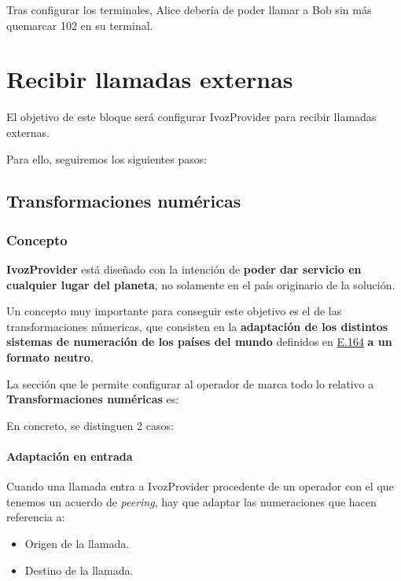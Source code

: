 \documentclass[letterpaper,10pt,spanish]{sphinxmanual}
\begin{document}
Tras configurar los terminales, Alice debería de poder llamar a Bob sin más quemarcar 102 en su terminal.


\chapter{Recibir llamadas externas}
\label{external_incoming_calls/index::doc}\label{external_incoming_calls/index:receive-external-calls}
El objetivo de este bloque será configurar IvozProvider para recibir llamadas externas.

Para ello, seguiremos los siguientes pasos:


\section{Transformaciones numéricas}
\label{external_incoming_calls/numeric_transformations:id1}\label{external_incoming_calls/numeric_transformations::doc}\label{external_incoming_calls/numeric_transformations:numeric-transformations}

\subsection{Concepto}
\label{external_incoming_calls/numeric_transformations:concept}
\textbf{IvozProvider} está diseñado con la intención de \textbf{poder dar servicio en cualquier lugar del planeta}, no solamente en el país originario de la solución.

Un concepto muy importante para conseguir este objetivo es el de las transformaciones númericas, que consisten en la \textbf{adaptación de los distintos sistemas de numeración de los países del mundo} definidos en \href{https://www.itu.int/rec/T-REC-E.164/es}{E.164} \textbf{a un formato neutro}.

La sección que le permite configurar al operador de marca todo lo relativo a \textbf{Transformaciones numéricas} es:


En concreto, se distinguen 2 casos:


\subsubsection{Adaptación en entrada}
\label{external_incoming_calls/numeric_transformations:incoming-transformations}
Cuando una llamada entra a IvozProvider procedente de un operador con el que tenemos un acuerdo de \emph{peering}, hay que adaptar las numeraciones que hacen referencia a:
\begin{itemize}
\item {} 
Origen de la llamada.

\item {} 
Destino de la llamada.

\end{itemize}
\end{document}
